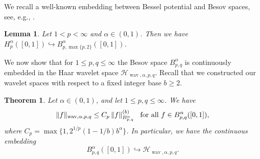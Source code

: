 \documentclass[12pt]{article}
\DeclareMathOperator{\wav}{wav}
\newtheorem{theorem}{Theorem}
\newtheorem{lemma}{Lemma}
\newcommand{\HH}{\mathcal{H}}
\begin{document}
We recall a well-known embedding between Bessel potential and Besov spaces, see, e.g.,
\cite[2.3.2]{Tri83}.

\begin{lemma}\label{einbettung2}
Let $1<p<\infty$ and $\alpha \in (0,1)$.
Then we have  
$H^\alpha_p ([0,1]) \hookrightarrow B^\alpha_{p,\max \{p,2\}}([0,1])$.
\end{lemma}



We now show that for $1 \le p,q \le \infty$ the Besov space $B^\alpha_{p,q}$ is
continuously embedded in the Haar wavelet space $\mathcal{H}_{\wav,\alpha,p,q}$.
Recall that we constructed our wavelet spaces with respect to a fixed integer base $b\ge 2$.

\begin{theorem}\label{BesovHaar}
Let $\alpha\in (0,1)$, and let $1\le p,q \le \infty$. 
We have
\begin{equation*}
\|f\|_{\wav,\alpha,p,q} \le C_p \,
\|f\|^{(b)}_{B^\alpha_{p,q}}
\hspace{2ex}\text{for all $f\in B^\alpha_{p,q} ([0,1])$,}
\end{equation*}
where $C_p= \max\{1, 2^{1/p} (1-1/b) b^\alpha\}$.
In particular, we have the continuous embedding
\begin{equation*}
B_{p,q}^\alpha ([0,1]) \hookrightarrow \HH_{\wav,\alpha,p,q}.
\end{equation*}
\end{theorem}
\end{document}
